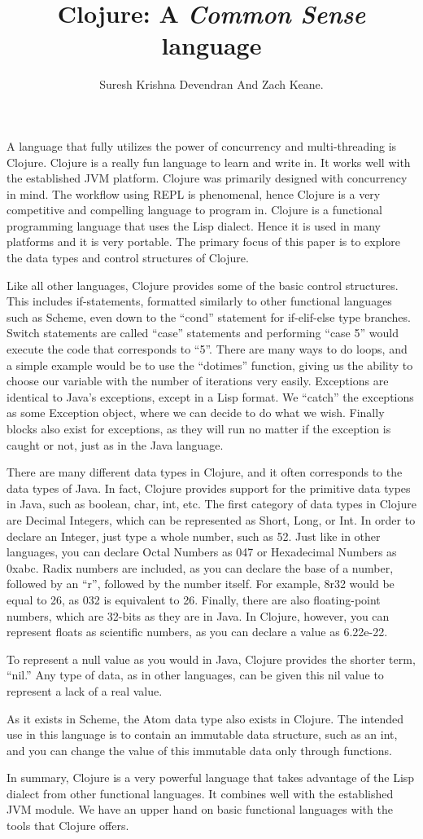 \documentclass{article}
\title{Clojure: A \emph{Common Sense} language }
\author{Suresh Krishna Devendran And Zach Keane.}
\begin{document}
\maketitle

A language that fully utilizes the power of concurrency and multi-threading is Clojure. Clojure is a really fun language to learn and write in. It works well with the established JVM platform. Clojure was primarily designed with concurrency in mind. The workflow using REPL is phenomenal, hence Clojure is a very competitive and compelling language to program in. Clojure is a functional programming language that uses the Lisp dialect. Hence it is used in many platforms and it is very portable. The primary focus of this paper is to explore the data types and control structures of Clojure. \par

Like all other languages, Clojure provides some of the basic control structures. This includes if-statements, formatted similarly to other functional languages such as Scheme, even down to the “cond” statement for if-elif-else type branches. Switch statements are called “case” statements and performing “case 5” would execute the code that corresponds to “5”. There are many ways to do loops, and a simple example would be to use the “dotimes” function, giving us the ability to choose our variable with the number of iterations very easily. Exceptions are identical to Java’s exceptions, except in a Lisp format. We “catch” the exceptions as some Exception object, where we can decide to do what we wish. Finally blocks also exist for exceptions, as they will run no matter if the exception is caught or not, just as in the Java language. \par

There are many different data types in Clojure, and it often corresponds to the data types of Java. In fact, Clojure provides support for the primitive data types in Java, such as boolean, char, int, etc. The first category of data types in Clojure are Decimal Integers, which can be represented as Short, Long, or Int. In order to declare an Integer, just type a whole number, such as 52. Just like in other languages, you can declare Octal Numbers as 047 or Hexadecimal Numbers as 0xabc. Radix numbers are included, as you can declare the base of a number, followed by an “r”, followed by the number itself. For example, 8r32 would be equal to 26, as 032 is equivalent to 26. Finally, there are also floating-point numbers, which are 32-bits as they are in Java. In Clojure, however, you can represent floats as scientific numbers, as you can declare a value as 6.22e-22. \par
To represent a null value as you would in Java, Clojure provides the shorter term, “nil.” Any type of data, as in other languages, can be given this nil value to represent a lack of a real value. \par
As it exists in Scheme, the Atom data type also exists in Clojure. The intended use in this language is to contain an immutable data structure, such as an int, and you can change the value of this immutable data only through functions. \par

In summary, Clojure is a very powerful language that takes advantage of the Lisp dialect from other functional languages. It combines well with the established JVM module. We have an upper hand on basic functional languages with the tools that Clojure offers. \par
\end{document}
